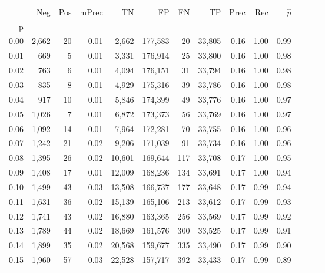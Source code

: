 \begin{tabular}{rrrrrrrrrrrrrr}
\toprule
{} &    Neg &  Pos & mPrec &       TN &       FP &      FN &      TP &  Prec &   Rec & $\hat{p}$ \\
p    &        &      &       &          &          &         &         &       &       &           \\
\midrule
0.00 &  2,662 &   20 &  0.01 &    2,662 &  177,583 &      20 &  33,805 &  0.16 &  1.00 &      0.99 \\
0.01 &    669 &    5 &  0.01 &    3,331 &  176,914 &      25 &  33,800 &  0.16 &  1.00 &      0.98 \\
0.02 &    763 &    6 &  0.01 &    4,094 &  176,151 &      31 &  33,794 &  0.16 &  1.00 &      0.98 \\
0.03 &    835 &    8 &  0.01 &    4,929 &  175,316 &      39 &  33,786 &  0.16 &  1.00 &      0.98 \\
0.04 &    917 &   10 &  0.01 &    5,846 &  174,399 &      49 &  33,776 &  0.16 &  1.00 &      0.97 \\
0.05 &  1,026 &    7 &  0.01 &    6,872 &  173,373 &      56 &  33,769 &  0.16 &  1.00 &      0.97 \\
0.06 &  1,092 &   14 &  0.01 &    7,964 &  172,281 &      70 &  33,755 &  0.16 &  1.00 &      0.96 \\
0.07 &  1,242 &   21 &  0.02 &    9,206 &  171,039 &      91 &  33,734 &  0.16 &  1.00 &      0.96 \\
0.08 &  1,395 &   26 &  0.02 &   10,601 &  169,644 &     117 &  33,708 &  0.17 &  1.00 &      0.95 \\
0.09 &  1,408 &   17 &  0.01 &   12,009 &  168,236 &     134 &  33,691 &  0.17 &  1.00 &      0.94 \\
0.10 &  1,499 &   43 &  0.03 &   13,508 &  166,737 &     177 &  33,648 &  0.17 &  0.99 &      0.94 \\
0.11 &  1,631 &   36 &  0.02 &   15,139 &  165,106 &     213 &  33,612 &  0.17 &  0.99 &      0.93 \\
0.12 &  1,741 &   43 &  0.02 &   16,880 &  163,365 &     256 &  33,569 &  0.17 &  0.99 &      0.92 \\
0.13 &  1,789 &   44 &  0.02 &   18,669 &  161,576 &     300 &  33,525 &  0.17 &  0.99 &      0.91 \\
0.14 &  1,899 &   35 &  0.02 &   20,568 &  159,677 &     335 &  33,490 &  0.17 &  0.99 &      0.90 \\
0.15 &  1,960 &   57 &  0.03 &   22,528 &  157,717 &     392 &  33,433 &  0.17 &  0.99 &      0.89 \\

\end{tabular}
